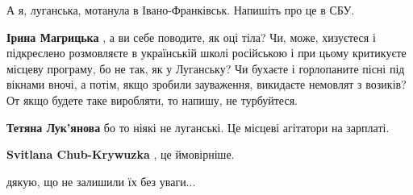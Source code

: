 \begin{itemize}
\begin{itemize}
 
А я, луганська, мотанула в Івано-Франківськ. Напишіть про це в СБУ.

 
\textbf{Ірина Магрицька} , а ви себе поводите, як оці тіла? Чи, може, хизуєтеся і підкреслено розмовляєте в українській школі російською і при цьому критикуєте місцеву програму, бо не так, як у Луганську? Чи бухаєте і горлопаните пісні під вікнами вночі, а потім, якщо зробили зауваження, викидаєте немовлят з возиків? От якщо будете таке виробляти, то напишу, не турбуйтеся.

 
\textbf{Тетяна Лук'янова} бо то ніякі не луганські. Це місцеві агітатори на зарплаті.

 
\textbf{Svitlana Chub-Krywuzka} , це ймовірніше.
\end{itemize}

 
дякую, що не залишили їх без уваги...

 

\end{itemize}
